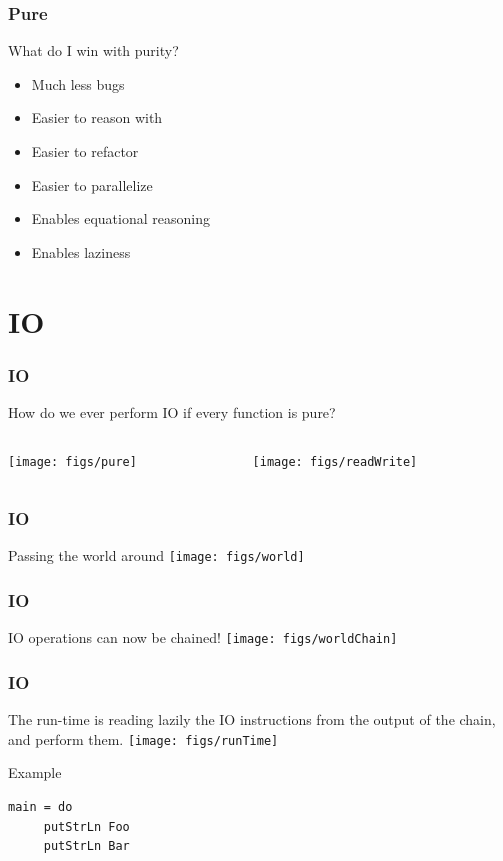 \documentclass{beamer}
\begin{document}
\begin{frame}
\frametitle{Pure}

What do I win with purity?
 \vspace{0.5cm}
 \begin{itemize}
  \item Much less bugs
  \item Easier to reason with
  \item Easier to refactor
  \item Easier to parallelize
  \item Enables equational reasoning
  \item Enables laziness
 \end{itemize}

\end{frame}



\section{IO}
\begin{frame}
\frametitle{IO}

 How do we ever perform IO if every function is pure?
  \vspace{1cm}
  \begin{columns}[]
   \begin{column}[]{5cm}
    \texttt{[image: figs/pure]}
   \end{column}
   \begin{column}[]{5cm}
    \texttt{[image: figs/readWrite]}
   \end{column}
  \end{columns}

\end{frame}

\begin{frame}
\frametitle{IO}
 Passing the world around
 \texttt{[image: figs/world]}
\end{frame}

\begin{frame}
\frametitle{IO}
 IO operations can now be chained!
 \texttt{[image: figs/worldChain]}

\end{frame}

\begin{frame}[fragile]
\frametitle{IO}
 The run-time is reading lazily the IO instructions from the output of the chain, and perform them.
 \texttt{[image: figs/runTime]}
 \begin{block}{Example}
  \begin{lstlisting}[basicstyle=\small]
   main = do
     putStrLn Foo
     putStrLn Bar
  \end{lstlisting}
 \end{block}

\end{frame}
\end{document}
